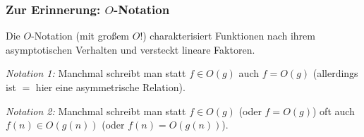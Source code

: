 \documentclass[onlymath]{beamer}
\begin{document}
\begin{frame}\frametitle{Zur Erinnerung: $O$-Notation}

Die $O$-Notation (mit großem $O$!) charakterisiert Funktionen nach ihrem asymptotischen Verhalten und
versteckt lineare Faktoren.


\emph{Notation 1:} Manchmal schreibt man statt $f\in O(g)$ auch $f=O(g)$ (allerdings ist $=$ hier eine
asymmetrische Relation).\medskip

\emph{Notation 2:} Manchmal schreibt man statt $f\in O(g)$ (oder $f=O(g)$) oft auch $f(n)\in O(g(n))$ (oder $f(n)=O(g(n))$).


\end{frame}
\end{document}
